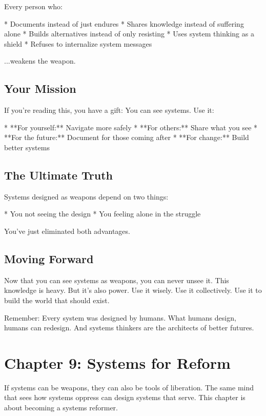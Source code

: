 \documentclass[12pt,oneside]{book}
\begin{document}
Every person who:

                    * Documents instead of just endures
                    * Shares knowledge instead of suffering alone
                    * Builds alternatives instead of only resisting
                    * Uses system thinking as a shield
                    * Refuses to internalize system messages

...weakens the weapon.

\section{Your Mission}

If you're reading this, you have a gift: You can see systems. Use it:

                    * **For yourself:** Navigate more safely
                    * **For others:** Share what you see
                    * **For the future:** Document for those coming after
                    * **For change:** Build better systems

\section{The Ultimate Truth}

Systems designed as weapons depend on two things:

                    * You not seeing the design
                    * You feeling alone in the struggle

You've just eliminated both advantages.

\section{Moving Forward}

Now that you can see systems as weapons, you can never unsee it. This knowledge is heavy. But it's also power. Use it wisely. Use it collectively. Use it to build the world that should exist.

Remember: Every system was designed by humans. What humans design, humans can redesign. And systems thinkers are the architects of better futures.

\chapter{Chapter 9: Systems for Reform}

If systems can be weapons, they can also be tools of liberation. The same mind that sees how systems oppress can design systems that serve. This chapter is about becoming a systems reformer.
\end{document}
